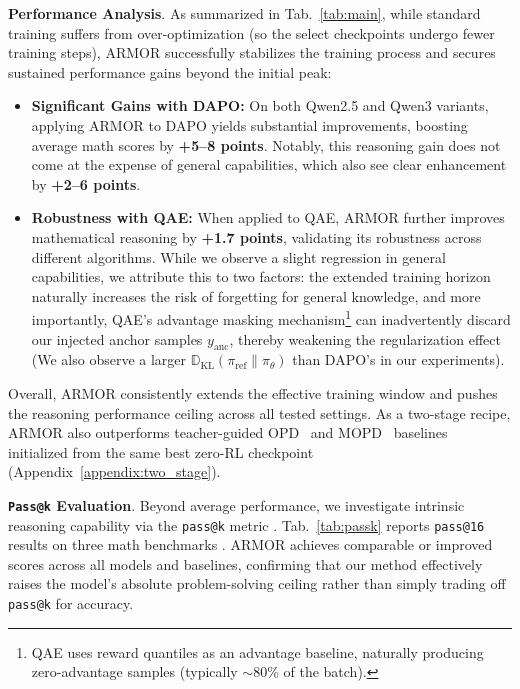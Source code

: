 \textbf{Performance Analysis}.
As summarized in Tab.~\ref{tab:main}, while standard training suffers from over-optimization (so the select checkpoints undergo fewer training steps), ARMOR successfully stabilizes the training process and secures sustained performance gains beyond the initial peak:
\begin{itemize}[left=0em,topsep=0pt,itemsep=0pt]
    \item \textbf{Significant Gains with DAPO:} On both Qwen2.5 and Qwen3 variants, applying ARMOR to DAPO yields substantial improvements, boosting average math scores by \textbf{+5--8 points}. Notably, this reasoning gain does not come at the expense of general capabilities, which also see clear enhancement by \textbf{+2--6 points}.
    \item \textbf{Robustness with QAE:} When applied to QAE, ARMOR further improves mathematical reasoning by \textbf{+1.7 points}, validating its robustness across different algorithms.
    While we observe a slight regression in general capabilities, we attribute this to two factors: the extended training horizon naturally increases the risk of forgetting for general knowledge, and more importantly, QAE's advantage masking mechanism\footnote{QAE uses reward quantiles as an advantage baseline, naturally producing zero-advantage samples (typically $\sim$80\% of the batch).} can inadvertently discard our injected anchor samples $y_\text{anc}$, thereby weakening the regularization effect (We also observe a larger $\mathbb D_\text{KL}(\pi_\text{ref}\|\pi_\theta)$ than DAPO's in our experiments).
\end{itemize}
Overall, ARMOR consistently extends the effective training window and pushes the reasoning performance ceiling across all tested settings.
As a two-stage recipe, ARMOR also outperforms teacher-guided OPD~\citep{agarwal2024policy} and MOPD~\citep{xiao2026mimo} baselines initialized from the same best zero-RL checkpoint (Appendix~\ref{appendix:two_stage}).




\textbf{\texttt{Pass@k} Evaluation}.
Beyond average performance, we investigate intrinsic reasoning capability via the \texttt{pass@k} metric \cite{yue2025does}.
Tab.~\ref{tab:passk} reports \texttt{pass@16} results on three math benchmarks \citep{passk}. 
ARMOR achieves comparable or improved scores across all models and baselines, confirming that our method effectively raises the model's absolute problem-solving ceiling rather than simply trading off \texttt{pass@k} for accuracy.

